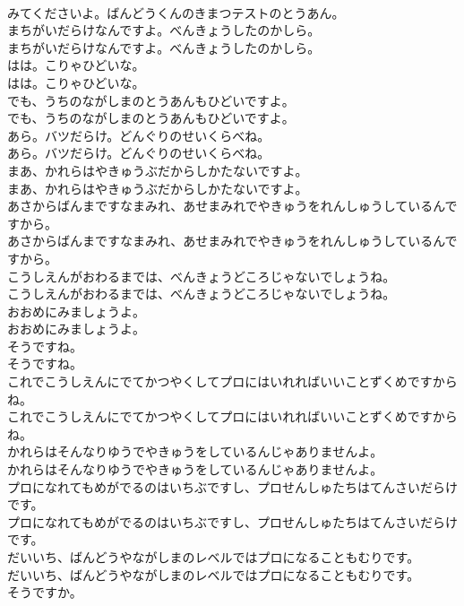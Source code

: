\documentclass[8pt]{extreport}
\begin{document}
\begin{CJK}{UTF8}{min}
\\	みてくださいよ。ばんどうくんのきまつテストのとうあん。
\\	まちがいだらけなんですよ。べんきょうしたのかしら。
\\	まちがいだらけなんですよ。べんきょうしたのかしら。
\\	はは。こりゃひどいな。
\\	はは。こりゃひどいな。
\\	でも、うちのながしまのとうあんもひどいですよ。
\\	でも、うちのながしまのとうあんもひどいですよ。
\\	あら。バツだらけ。どんぐりのせいくらべね。
\\	あら。バツだらけ。どんぐりのせいくらべね。
\\	まあ、かれらはやきゅうぶだからしかたないですよ。
\\	まあ、かれらはやきゅうぶだからしかたないですよ。
\\	あさからばんまですなまみれ、あせまみれでやきゅうをれんしゅうしているんですから。
\\	あさからばんまですなまみれ、あせまみれでやきゅうをれんしゅうしているんですから。
\\	こうしえんがおわるまでは、べんきょうどころじゃないでしょうね。
\\	こうしえんがおわるまでは、べんきょうどころじゃないでしょうね。
\\	おおめにみましょうよ。
\\	おおめにみましょうよ。
\\	そうですね。
\\	そうですね。
\\	これでこうしえんにでてかつやくしてプロにはいれればいいことずくめですからね。
\\	これでこうしえんにでてかつやくしてプロにはいれればいいことずくめですからね。
\\	かれらはそんなりゆうでやきゅうをしているんじゃありませんよ。
\\	かれらはそんなりゆうでやきゅうをしているんじゃありませんよ。
\\	プロになれてもめがでるのはいちぶですし、プロせんしゅたちはてんさいだらけです。
\\	プロになれてもめがでるのはいちぶですし、プロせんしゅたちはてんさいだらけです。
\\	だいいち、ばんどうやながしまのレベルではプロになることもむりです。
\\	だいいち、ばんどうやながしまのレベルではプロになることもむりです。
\\	そうですか。

\end{CJK}
\end{document}
